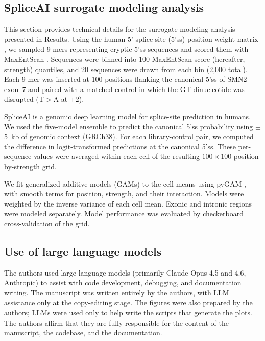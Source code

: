 \documentclass[pdflatex,sn-vancouver-num,referee,oneside]{sn-jnl}
\begin{document}
\subsection*{SpliceAI surrogate modeling analysis}\label{subsec:spliceai-surrogate-analysis}

This section provides technical details for the surrogate modeling analysis presented in Results. Using the human 5' splice site (5'ss) position weight matrix \citep{Wong2018quantitative}, we sampled 9-mers representing cryptic 5'ss sequences and scored them with MaxEntScan \citep{Yeo2004me}. Sequences were binned into 100 MaxEntScan score (hereafter, strength) quantiles, and 20 sequences were drawn from each bin (2,000 total). Each 9-mer was inserted at 100 positions flanking the canonical 5'ss of SMN2 exon~7 and paired with a matched control in which the GT dinucleotide was disrupted (T$>$A at $+2$).

SpliceAI \citep{Jaganathan2019ps} is a genomic deep learning model for splice-site prediction in humans. We used the five-model ensemble to predict the canonical 5'ss probability using $\pm$5~kb of genomic context (GRCh38). For each library-control pair, we computed the difference in logit-transformed predictions at the canonical 5'ss. These per-sequence values were averaged within each cell of the resulting $100 \times 100$ position-by-strength grid.

We fit generalized additive models (GAMs) to the cell means using pyGAM \citep{Serven2018pg}, with smooth terms for position, strength, and their interaction. Models were weighted by the inverse variance of each cell mean. Exonic and intronic regions were modeled separately. Model performance was evaluated by checkerboard cross-validation of the grid.

\subsection*{Use of large language models}\label{subsec:llm-disclosure}

The authors used large language models (primarily Claude Opus 4.5 and 4.6, Anthropic) to assist with code development, debugging, and documentation writing. The manuscript was written entirely by the authors, with LLM assistance only at the copy-editing stage. The figures were also prepared by the authors; LLMs were used only to help write the scripts that generate the plots. The authors affirm that they are fully responsible for the content of the manuscript, the codebase, and the documentation. 
\end{document}
